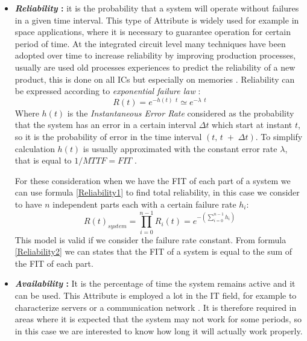 {{{{\begin{itemize}
					\item \textbf{\textit{Reliability} : } it is the probability that a system will operate without failures in a given time interval. This type of Attribute is widely used for example in space applications, where it is necessary to guarantee operation for certain period of time.  At the integrated circuit level many techniques have been adopted over time to increase reliability by improving production processes, usually are used old processes experiences to predict the reliability of a new product, this is done on all ICs but especially on memories . Reliability can be expressed according to \textit{exponential failure law} :
					\begin{equation} \label{Reliability1}
						R(t)= e^{-h(t) \:\: t} \simeq e^{-\lambda \:\: t} 
					\end{equation} 
					Where $h(t)$ is the \textit{Instantaneous Error Rate} considered as the probability that the system has an error in a certain interval $\Delta t$ which start at instant $t$, so it is the probability of error in the time interval $(t,\, t\;+\;\Delta t )$. To simplify calculation $h(t)$ is usually approximated with the constant error rate $\lambda$, that is equal to $1/MTTF = FIT$ .
					
					For these consideration when we have the FIT of each part of a system we can use formula \ref{Reliability1} to find total reliability, in this  case we consider to have $n$ independent parts each with a certain failure rate $h_i$:
					\begin{equation} \label{Reliability2}
						R(t)_{system} = \prod_{i=0}^{n-1}R_i(t) = e^{-\left(\sum_{i=0}^{n-1}h_i\right)}
					\end{equation}
					This model is valid if we consider the failure rate constant. From formula \ref{Reliability2}  we can states that the FIT of a system is equal to the sum of the FIT of each part.
					
					\item \textbf{\textit{Availability} : } It is the percentage of time the system remains active and it can be used. This Attribute is employed a lot in the IT field, for example to characterize servers or a communication network   . It is therefore required in areas where it is expected that the system may not work for some periods, so in this case we are interested to know how long it will actually work properly. 
					

\end{itemize}}}}}
